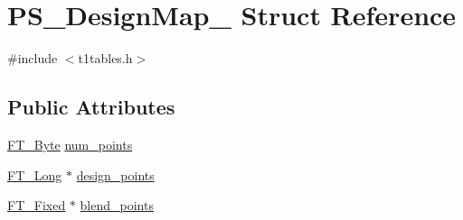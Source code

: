 \hypertarget{struct_p_s___design_map__}{\section{P\-S\-\_\-\-Design\-Map\-\_\- Struct Reference}
\label{struct_p_s___design_map__}
}


{\ttfamily \#include $<$t1tables.\-h$>$}

\subsection*{Public Attributes}
\begin{DoxyCompactItemize}
\item 
\hyperlink{fttypes_8h_a51f26183ca0c9f4af958939648caeccd}{F\-T\-\_\-\-Byte} \hyperlink{struct_p_s___design_map___a505a70dd0f497f177fffca9bc4e5d0a5}{num\-\_\-points}
\item 
\hyperlink{fttypes_8h_a7fa72a1f0e79fb1860c5965789024d6f}{F\-T\-\_\-\-Long} $\ast$ \hyperlink{struct_p_s___design_map___abd7a86ba33248ceed657c31063b49679}{design\-\_\-points}
\item 
\hyperlink{fttypes_8h_a5f5a679cc09f758efdd0d1c5feed3c3d}{F\-T\-\_\-\-Fixed} $\ast$ \hyperlink{struct_p_s___design_map___a74a555fb4315fca7477f6d20d49686ec}{blend\-\_\-points}
\end{DoxyCompactItemize}


